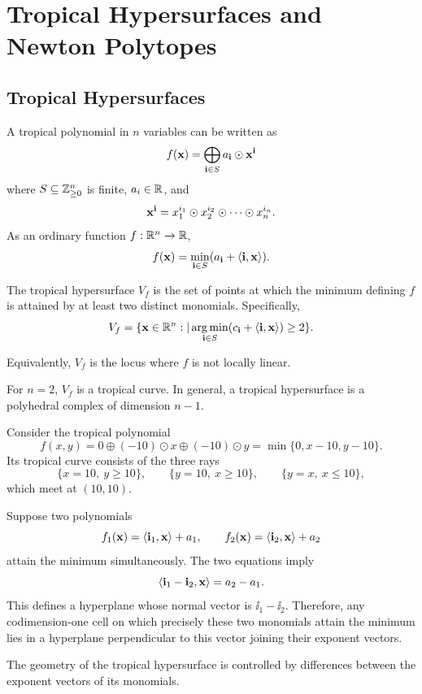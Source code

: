 \documentclass[../../main.tex]{subfiles}
\begin{document}
\section{Tropical Hypersurfaces and Newton Polytopes}

\subsection{Tropical Hypersurfaces}

A tropical polynomial in $n$ variables can be written as
\[f(\mathbf{x})=\bigoplus_{\mathbf{i} \in S}a_{\mathbf{i}}\odot \mathbf{x}^{\mathbf{i}}\]
where $S\subseteq \mathbb{Z}_{\ge 0}^n$ is finite, $a_i\in \mathbb{R}$, and 
\[\mathbf{x}^{\mathbf{i}}=x_1^{i_1}\odot x_2^{i_2}\odot\cdots \odot x_n^{i_n}.\]
As an ordinary function $f:\mathbb{R}^n \to \mathbb{R}$,
\[f(\mathbf{x})=\min_{\mathbf{i} \in S}(a_{\mathbf{i}}+\langle \mathbf{i},\mathbf{x}\rangle ).\]

\begin{defin}
    The tropical hypersurface $V_f$ is the set of points at which the minimum defining $f$ is attained by at least two distinct monomials. Specifically,
    \[V_f=\{\mathbf{x} \in \mathbb{R}^n:|\operatorname*{arg\,min}_{\mathbf{i} \in S}(c_{\mathbf{i}}+\langle \mathbf{i},\mathbf{x}\rangle )\ge 2\}.\]

    Equivalently, $V_f$ is the locus where $f$ is not locally linear. 

    For $n=2$, $V_f$ is a tropical curve. In general, a tropical hypersurface is a polyhedral complex of dimension $n-1$.
\end{defin}

\begin{example} \label{example:tropical-line-at-ten}
    Consider the tropical polynomial
    \[f(x,y)=0\oplus(-10)\odot x\oplus(-10)\odot y=\min\{0,x-10,y-10\}.\]
    Its tropical curve consists of the three rays
    \[\{x=10,\ y\ge 10\},\qquad
    \{y=10,\ x\ge 10\},\qquad
    \{y=x,\ x\le 10\},\]
    which meet at $(10,10)$.

    \TropicalLineFigure
\end{example}

Suppose two polynomials
\[f_1(\mathbf{x})=\langle \mathbf{i}_1,\mathbf{x}\rangle+a_1,\qquad f_2(\mathbf{x})=\langle \mathbf{i}_2,\mathbf{x}\rangle +a_2\]
attain the minimum simultaneously. The two equations imply
\[\langle\mathbf{i}_1-\mathbf{i}_2,\mathbf{x}\rangle=a_2-a_1.\]
This defines a hyperplane whose normal vector is $\ii_1-\ii_2$. Therefore, any codimension-one cell on which precisely these two monomials attain the minimum lies in a hyperplane perpendicular to this vector joining their exponent vectors.

The geometry of the tropical hypersurface is controlled by differences between the exponent vectors of its monomials. 
\end{document}
